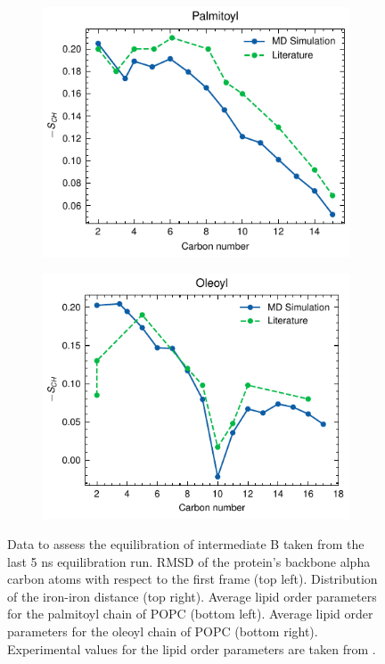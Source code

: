 \begin{figure}[htbp]
\begin{subfigure}{.49\textwidth}
        \includegraphics[width=\textwidth]{Figures/B_palmitoyl.pdf}
    \end{subfigure}
    \begin{subfigure}{.49\textwidth}
        \centering
        \includegraphics[width=\textwidth]{Figures/B_oleoyl.pdf}
    \end{subfigure}
    \caption{Data to assess the equilibration of intermediate B taken from the last 5 ns equilibration run. RMSD of the protein's backbone alpha carbon atoms with respect to the first frame (top left). Distribution of the iron-iron distance (top right). Average lipid order parameters for the palmitoyl chain of POPC (bottom left). Average lipid order parameters for the oleoyl chain of POPC (bottom right). Experimental values for the lipid order parameters are taken from \cite{Seelig1978,Perly1985}.}
    \label{fig:B_equilibration}
\end{figure}


